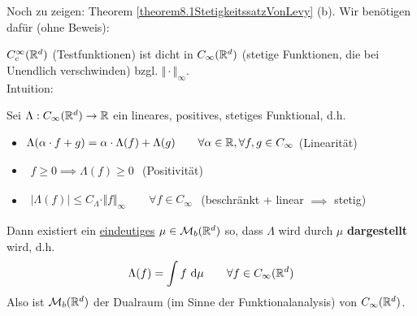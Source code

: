 Noch zu zeigen: Theorem \ref{theorem8.1StetigkeitssatzVonLevy} (b). 
Wir benötigen dafür (ohne Beweis):

\begin{lemma}\label{lemma8.2}
	$C_c^\infty(\mathbb{R}^d)$ (Testfunktionen) ist dicht in $C_\infty(\mathbb{R}^d)$ (stetige Funktionen, die bei Unendlich verschwinden) bzgl. $\Vert\cdot\Vert_\infty$.\\
	Intuition: %
\end{lemma}

\begin{theorem}\label{theorem8.4RieszscherDarstellungssatzFuerM_b}\enter
	Sei $\Lambda:C_\infty(\mathbb{R}^d)\to\mathbb{R}$ ein lineares, positives, stetiges Funktional, d.h.
	\begin{itemize}
		\item $\begin{aligned}
			\Lambda(\alpha\cdot f+g)=\alpha\cdot\Lambda(f)+\Lambda(g)\qquad\forall\alpha\in\mathbb{R},\forall f,g\in C_\infty
		\end{aligned}$ (Linearität)
		\item $\begin{aligned}
			f\geq0\implies\Lambda(f)\geq0
		\end{aligned}$ (Positivität)
		\item $\begin{aligned}
			\big|\Lambda(f)\big|\leq C_\Lambda\cdot\Vert f\Vert_\infty\qquad\forall f\in C_\infty
		\end{aligned}$ (beschränkt + linear $\implies$ stetig)
	\end{itemize} 
	Dann existiert ein \underline{eindeutiges} $\mu\in\mathcal{M}_b(\mathbb{R}^d)$ so, dass $\Lambda$ wird durch $\mu$ \textbf{dargestellt} wird, d.h.
	\begin{align*}
		\Lambda(f)=\int\limits f\text{ d}\mu\qquad\forall f\in C_\infty(\mathbb{R}^d)
	\end{align*}
	Also ist $\mathcal{M}_b(\mathbb{R}^d)$ der Dualraum (im Sinne der Funktionalanalysis) von $C_\infty(\mathbb{R}^d)$.
\end{theorem}

